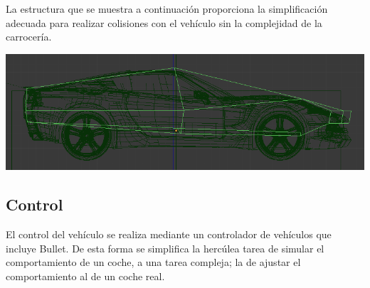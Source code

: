 \documentclass[10pt,a4paper,hidelinks]{article}
\begin{document}
La estructura que se muestra a continuación proporciona la simplificación 
adecuada para realizar colisiones con el vehículo sin la complejidad de la 
carrocería.

\includegraphics[width=\textwidth]{vehiculo-colision}

\subsection{Control}
El control del vehículo se realiza mediante un controlador de vehículos que 
incluye Bullet. De esta forma se simplifica la hercúlea tarea de simular el 
comportamiento de un coche, a una tarea compleja; la de ajustar el 
comportamiento al de un coche real.
\end{document}
